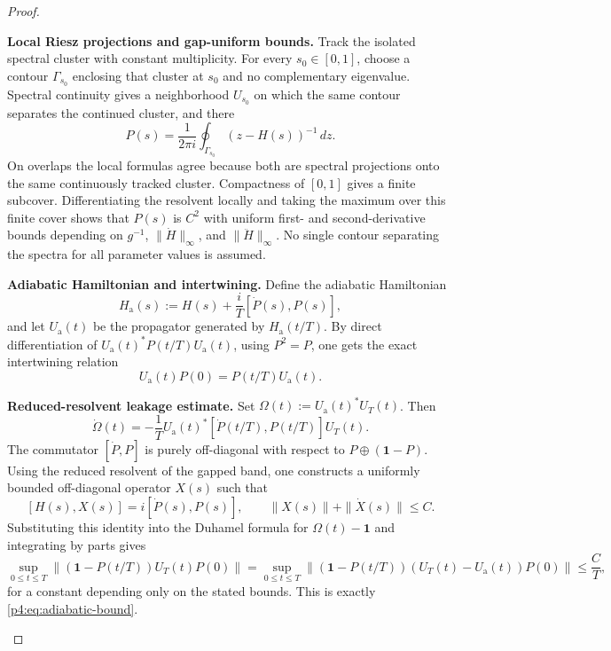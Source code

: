 \documentclass[12pt,a4paper]{article}
\begin{document}
\begin{proof}
\begin{proofsteps}

\item \textbf{Local Riesz projections and gap-uniform bounds.}
Track the isolated spectral cluster with constant multiplicity.  For every
\(s_0\in[0,1]\), choose a contour \(\Gamma_{s_0}\) enclosing that cluster
at \(s_0\) and no complementary eigenvalue.  Spectral continuity gives a
neighborhood \(U_{s_0}\) on which the same contour separates the continued
cluster, and there
\[
P(s)=\frac{1}{2\pi i}
\oint_{\Gamma_{s_0}}(z-H(s))^{-1}\,dz .
\]
On overlaps the local formulas agree because both are spectral projections
onto the same continuously tracked cluster.  Compactness of \([0,1]\) gives
a finite subcover.  Differentiating the resolvent locally and taking the
maximum over this finite cover shows that \(P(s)\) is \(C^2\) with uniform
first- and second-derivative bounds depending on
\(g^{-1}\), \(\|\dot H\|_\infty\), and
\(\|\ddot H\|_\infty\).  No single contour separating the spectra for all
parameter values is assumed.

\item \textbf{Adiabatic Hamiltonian and intertwining.}
Define the adiabatic Hamiltonian
\[
H_{\mathrm a}(s):=H(s)+\frac{i}{T}[\dot P(s),P(s)],
\]
and let \(U_{\mathrm a}(t)\) be the propagator generated by \(H_{\mathrm a}(t/T)\).
By direct differentiation of \(U_{\mathrm a}(t)^*P(t/T)U_{\mathrm a}(t)\), using \(P^2=P\), one gets the exact intertwining relation
\[
U_{\mathrm a}(t)P(0)=P(t/T)U_{\mathrm a}(t).
\]


\item \textbf{Reduced-resolvent leakage estimate.}
Set \(\Omega(t):=U_{\mathrm a}(t)^*U_T(t)\).
Then
\[
\dot\Omega(t)=-\frac1T U_{\mathrm a}(t)^*[\dot P(t/T),P(t/T)]U_T(t).
\]
The commutator \([\dot P,P]\) is purely off-diagonal with respect to \(P\oplus(\mathbf1-P)\).
Using the reduced resolvent of the gapped band, one constructs a uniformly bounded off-diagonal operator \(X(s)\) such that
\[
[H(s),X(s)]=i[\dot P(s),P(s)],
\qquad
\|X(s)\|+\|\dot X(s)\|\le C.
\]
Substituting this identity into the Duhamel formula for \(\Omega(t)-\mathbf1\) and integrating by parts gives
\[
\sup_{0\le t\le T}\| (\mathbf1-P(t/T))U_T(t)P(0)\|
=
\sup_{0\le t\le T}\|(\mathbf1-P(t/T))(U_T(t)-U_{\mathrm a}(t))P(0)\|
\le \frac{C}{T},
\]
for a constant depending only on the stated bounds.
This is exactly \eqref{p4:eq:adiabatic-bound}.



\end{proofsteps}
\end{proof}
\end{document}
